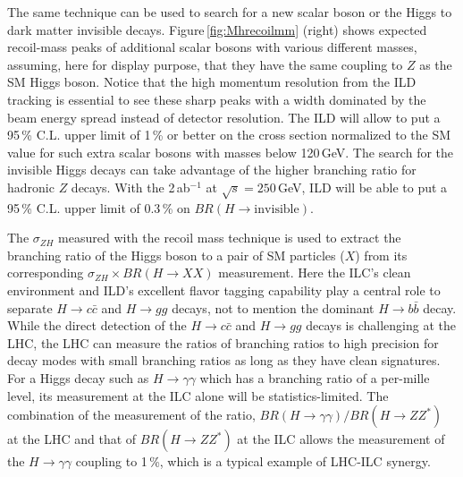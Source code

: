 The same technique can be used to search for a new scalar boson or the Higgs to dark matter invisible decays. 
Figure\,\ref{fig:Mhrecoilmm} (right) shows expected recoil-mass peaks of additional scalar bosons with various different masses, assuming, here for display purpose, that they have the same coupling to $Z$ as the SM Higgs boson. 
Notice that the high momentum resolution from the ILD tracking is essential to see these sharp peaks with a width dominated by the beam energy spread instead of detector resolution.
The ILD will allow to put a 95\,\% C.L. upper limit of 1\,\% or better on the cross section normalized to the SM value for such extra scalar bosons with masses below 120\,GeV.
The search for the invisible Higgs decays can take advantage of the higher branching ratio for hadronic $Z$ decays. With the 2\,ab$^{-1}$ at $\sqrt{s}=250$\,GeV, ILD will be able to put a 95\,\% C.L. upper limit of 0.3\,\% on $BR(H\to \mathrm{invisible})$\cite{Ref:Hinvisible}.
%

The $\sigma_{ZH}$ measured with the recoil mass technique is used to extract the branching ratio of the Higgs boson to a pair of SM particles ($X$) from its corresponding $\sigma_{ZH} \times BR(H \to XX)$ measurement. Here the ILC's clean environment and ILD's excellent flavor tagging capability play a central role to separate $H \to c\bar{c}$ and $H \to gg$ decays, not to mention the dominant $H \to b\bar{b}$ decay.
While the direct detection of the $H \to c\bar{c}$ and $H \to gg$ decays is challenging at the LHC, the LHC can measure the ratios of branching ratios to high precision for decay modes with small branching ratios as long as they have clean signatures. For a Higgs decay such as $H \to \gamma\gamma$ which has a branching ratio of a per-mille level, its measurement at the ILC alone will be statistics-limited. The combination of the measurement of the ratio, $BR(H \to \gamma\gamma)/BR(H \to ZZ^*)$ at the LHC and that of  $BR(H \to ZZ^*)$ at the ILC allows the measurement of the $H\to\gamma\gamma$ coupling to 1\,\%, which is a typical example of LHC-ILC synergy.

